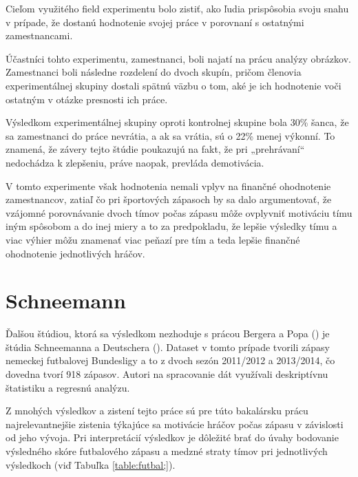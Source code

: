 \documentclass[
  digital, %
  oneside, %
  notable,   %
  lof,     %
  lot,     %
]{fithesis3}
\begin{document}
		Cieľom využitého field experimentu bolo zistiť, ako ľudia prispôsobia svoju snahu v prípade, že dostanú hodnotenie svojej práce v porovnaní s ostatnými zamestnancami. 
		
		Účastníci tohto experimentu, zamestnanci, boli najatí na prácu analýzy obrázkov. Zamestnanci boli následne rozdelení do dvoch skupín, pričom členovia experimentálnej skupiny dostali spätnú väzbu o tom, aké je ich hodnotenie voči ostatným v otázke presnosti ich práce. 
		
		Výsledkom experimentálnej skupiny oproti kontrolnej skupine bola 30\% šanca, že sa zamestnanci do práce nevrátia, a ak sa vrátia, sú o 22\% menej výkonní. To znamená, že závery tejto štúdie poukazujú na fakt, že pri „prehrávaní“ nedochádza k zlepšeniu, práve naopak, prevláda demotivácia. \parencite[s.~4]{barankay2010}
		
		V tomto experimente však hodnotenia nemali vplyv na finančné ohodnotenie zamestnancov, zatiaľ čo pri športových zápasoch by sa dalo argumentovať, že vzájomné porovnávanie dvoch tímov počas zápasu môže ovplyvniť motiváciu tímu iným spôsobom a do inej miery a to za predpokladu, že lepšie výsledky tímu a viac výhier môžu znamenať viac peňazí pre tím a teda lepšie finančné ohodnotenie jednotlivých hráčov.
		
		\section{Schneemann}
		Ďalšou štúdiou, ktorá sa výsledkom nezhoduje s prácou Bergera a Popa (\citeyear{berger2011}) je štúdia Schneemanna a Deutschera (\citeyear{schneemann2017}). Dataset v tomto prípade tvorili zápasy nemeckej futbalovej Bundesligy a to z dvoch sezón  2011/2012 a 2013/2014, čo dovedna tvorí 918 zápasov. Autori na spracovanie dát využívali deskriptívnu štatistiku a regresnú analýzu.
		
		Z mnohých výsledkov a zistení tejto práce sú pre túto bakalársku prácu najrelevantnejšie zistenia týkajúce sa motivácie hráčov počas zápasu v závislosti od jeho vývoja. Pri interpretácií výsledkov je dôležité brať do úvahy bodovanie výsledného skóre futbalového zápasu a medzné straty tímov pri jednotlivých výsledkoch (viď Tabuľka \ref{table:futbal;}).
		
\end{document}
